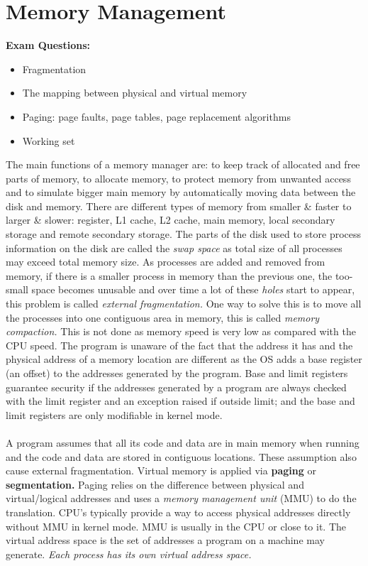 \documentclass[twoside]{article}
\begin{document}
\section{Memory Management}
\textbf{Exam Questions:}
\begin{itemize}
\item Fragmentation
\item The mapping between physical and virtual memory
\item Paging: page faults, page tables, page replacement algorithms
\item Working set
\end{itemize}
The main functions of a memory manager are: to keep track of allocated and free 
parts of memory, to allocate memory, to protect memory from unwanted access and 
to simulate bigger main memory by automatically moving data between the disk and
 memory. There are different types of memory from smaller \& faster to larger 
 \& slower: register, L1 cache, L2 cache, main memory, local secondary storage 
 and remote secondary storage. The parts of the disk used to store process 
 information on the disk are called the \emph{swap space} as total size of all 
 processes may exceed total memory size. As processes are added and removed from
 memory, if there is a smaller process in memory than the previous one, the too-small 
 space becomes unusable and over time a lot of these \emph{holes} start to 
 appear, this problem is called \emph{external fragmentation.} One way to solve 
 this is to move all the processes into one contiguous area in memory, this is 
 called \emph{memory compaction.} This is not done as memory speed is very low 
 as compared with the CPU speed. The program is unaware of the fact that the 
 address it has and the physical address of a memory location are different 
 as the OS adds a base register (an offset) to the addresses generated by the 
 program. Base and limit registers guarantee security if the addresses generated 
 by a program are always checked with the limit register and an exception raised 
 if outside limit; and the base and limit registers are only modifiable in kernel 
 mode.\\ \\

A program assumes that all its code and data are in main memory when running 
and the code and data are stored in contiguous locations. These assumption also 
cause external fragmentation. Virtual memory is applied via \textbf{paging} or 
\textbf{segmentation.} Paging relies on the difference between physical and 
virtual/logical addresses and uses a \emph{memory management unit} (MMU) to do 
the translation. CPU's typically provide a way to access physical addresses 
directly without MMU in kernel mode. MMU is usually in the CPU or close to it. 
The virtual address space is the set of addresses a program on a machine may 
generate. \emph{Each process has its own virtual address space.}\\ \\
\end{document}
